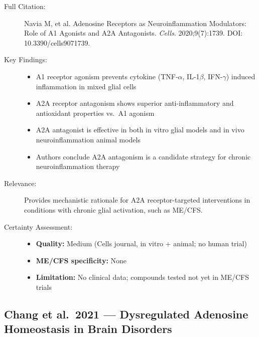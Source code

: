 \begin{description}
    \item[Full Citation:] Navia M, et al. Adenosine Receptors as Neuroinflammation Modulators: Role of A1 Agonists and A2A Antagonists. \textit{Cells}. 2020;9(7):1739. DOI: 10.3390/cells9071739.
    \item[Key Findings:]
    \begin{itemize}
        \item A1 receptor agonism prevents cytokine (TNF-$\alpha$, IL-1$\beta$, IFN-$\gamma$) induced inflammation in mixed glial cells
        \item A2A receptor antagonism shows superior anti-inflammatory and antioxidant properties vs.\ A1 agonism
        \item A2A antagonist is effective in both in vitro glial models and in vivo neuroinflammation animal models
        \item Authors conclude A2A antagonism is a candidate strategy for chronic neuroinflammation therapy
    \end{itemize}
    \item[Relevance:] Provides mechanistic rationale for A2A receptor-targeted interventions in conditions with chronic glial activation, such as ME/CFS.
    \item[Certainty Assessment:]
    \begin{itemize}
        \item \textbf{Quality:} Medium (Cells journal, in vitro + animal; no human trial)
        \item \textbf{ME/CFS specificity:} None
        \item \textbf{Limitation:} No clinical data; compounds tested not yet in ME/CFS trials
    \end{itemize}
\end{description}

\subsection{Chang et al.\ 2021 --- Dysregulated Adenosine Homeostasis in Brain Disorders}

